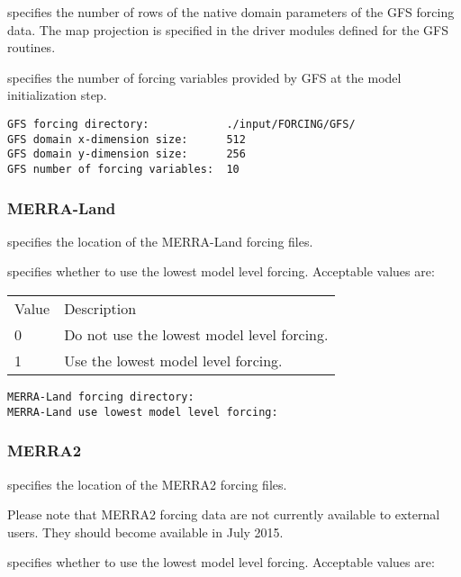   specifies the number of
 rows of the native domain parameters of the GFS forcing data.
 The map projection is specified in the driver modules defined for
 the GFS routines.

  specifies the number of
 forcing variables provided by GFS at the model initialization step. 
 

 \begin{Verbatim}[frame=single]
GFS forcing directory:            ./input/FORCING/GFS/
GFS domain x-dimension size:      512
GFS domain y-dimension size:      256
GFS number of forcing variables:  10
 \end{Verbatim}

 
 \subsubsection{MERRA-Land} \label{sssec:forcings_MERRALand}
  specifies the location of
 the MERRA-Land forcing files.

  specifies whether
 to use the lowest model level forcing.
 Acceptable values are:

 \begin{tabular}{ll}
 Value & Description                                \\
 0     & Do not use the lowest model level forcing. \\
 1     & Use the lowest model level forcing.        \\
 \end{tabular}
 

 \begin{Verbatim}[frame=single]
MERRA-Land forcing directory:
MERRA-Land use lowest model level forcing:
 \end{Verbatim}

 
 \subsubsection{MERRA2} \label{sssec:forcings_MERRA2}
  specifies the location of
 the MERRA2 forcing files.

 Please note that MERRA2 forcing data are not currently available
 to external users.  They should become available in July 2015.

  specifies whether
 to use the lowest model level forcing.
 Acceptable values are:

